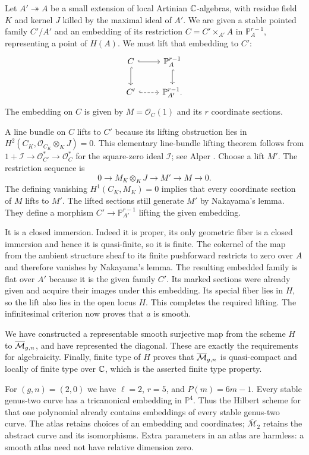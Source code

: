 Let $A'\twoheadrightarrow A$ be a small extension of local Artinian
$\mathbb C$-algebras, with residue field $K$ and kernel $J$ killed by the
maximal ideal of $A'$. We are given a stable pointed family $C'/A'$
and an embedding of its restriction $C=C'\times_{A'}A$ in
$\mathbb P^{r-1}_A$, representing a point of $H(A)$. We must lift
that embedding to $C'$:
\[
\begin{tikzcd}
 C\arrow[r,hook]\arrow[d,hook] & \mathbb P^{r-1}_A\arrow[d,hook]\\
 C'\arrow[r,dashed,hook] & \mathbb P^{r-1}_{A'}.
\end{tikzcd}
\]
The embedding on $C$ is given by $M=\mathcal O_C(1)$ and its
$r$ coordinate sections.

A line bundle on $C$ lifts to $C'$ because its lifting obstruction
lies in $H^2(C_K,\mathcal O_{C_K}\otimes_KJ)=0$.
This elementary line-bundle lifting theorem follows from
$1+\mathcal I\to\mathcal O_{C'}^*\to\mathcal O_C^*$ for the
square-zero ideal $\mathcal I$; see Alper
\cite[Proposition C.2.11 and Remark C.2.12, p.~602]{Alper}.
Choose a lift $M'$. The restriction sequence is
\[
 0\longrightarrow M_K\otimes_KJ
   \longrightarrow M'\longrightarrow M\longrightarrow0.
\]
The defining vanishing $H^1(C_K,M_K)=0$ implies that every
coordinate section of $M$ lifts to $M'$. The lifted sections
still generate $M'$ by Nakayama's lemma. They define a morphism
$C'\to\mathbb P^{r-1}_{A'}$ lifting the given embedding.

It is a closed immersion. Indeed it is proper, its only geometric
fiber is a closed immersion and hence it is quasi-finite, so it
is finite. The cokernel of the map from the ambient structure
sheaf to its finite pushforward restricts to zero over $A$ and
therefore vanishes by Nakayama's lemma. The resulting embedded
family is flat over $A'$ because it is the given family $C'$.
Its marked sections were already given and acquire their images
under this embedding. Its special fiber lies in $H$, so the
lift also lies in the open locus $H$. This completes the required
lifting. The infinitesimal criterion now proves that $a$ is smooth.

We have constructed a representable smooth surjective map from
the scheme $H$ to $\overline{\mathcal M}_{g,n}$, and have represented the diagonal.
These are exactly the requirements for algebraicity. Finally,
finite type of $H$ proves that $\overline{\mathcal M}_{g,n}$ is quasi-compact and
locally of finite type over $\mathbb C$, which is the asserted finite
type property.

\begin{Ex}
For $(g,n)=(2,0)$ we have $\ell=2$, $r=5$, and $P(m)=6m-1$.
Every stable genus-two curve has a tricanonical embedding in
$\mathbb P^4$. Thus the Hilbert scheme for that one polynomial
already contains embeddings of every stable genus-two curve.
The atlas retains choices of an embedding and coordinates;
$\overline{\mathcal M}_2$ retains the abstract curve and its
isomorphisms. Extra parameters in an atlas are harmless: a
smooth atlas need not have relative dimension zero.
\end{Ex}

